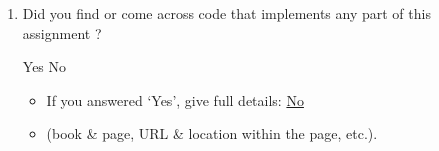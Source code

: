 \documentclass[11pt,addpoints,answers]{exam}
\numberwithin{equation}{section} %
\numberwithin{figure}{section} %
\numberwithin{table}{section} %
\begin{document}
\begin{enumerate}
    \item Did you find or come across code that implements any part of this assignment ? 
    \begin{checkboxes}
     \choice Yes
     \choice No
    \end{checkboxes}
    \begin{itemize}
        \item If you answered `Yes', give full details: \underline{No}
        \item (book \& page, URL \& location within the page, etc.).
    \end{itemize}
    \begin{tcolorbox}[fit,height=3cm,blank, borderline={1pt}{-2pt},nobeforeafter]
    \end{tcolorbox}
\end{enumerate}
\end{document}
